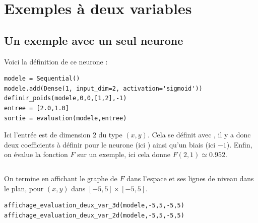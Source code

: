 \documentclass[11pt,class=report,crop=false]{standalone}
\begin{document}
\section{Exemples à deux variables}

\subsection{Un exemple avec un seul neurone}



Voici la définition de ce neurone :
\begin{lstlisting}
modele = Sequential()
modele.add(Dense(1, input_dim=2, activation='sigmoid'))
definir_poids(modele,0,0,[1,2],-1)
entree = [2.0,1.0]
sortie = evaluation(modele,entree)
\end{lstlisting}
Ici l'entrée est de dimension $2$ du type $(x,y)$. Cela se définit avec , il y a donc deux coefficients à définir pour le neurone (ici \ci{[1,2]}) ainsi qu'un biais (ici $-1$).  Enfin, on évalue la fonction $F$ sur un exemple, ici cela donne $F(2,1) \simeq 0.952$.
\begin{lstlisting}
\end{lstlisting}

On termine en affichant le graphe de $F$ dans l'espace et ses lignes de niveau dans le plan, pour $(x,y)$ dans $[-5,5]\times [-5,5]$.
\begin{lstlisting}
affichage_evaluation_deux_var_3d(modele,-5,5,-5,5)
affichage_evaluation_deux_var_2d(modele,-5,5,-5,5)
\end{lstlisting}
\end{document}
